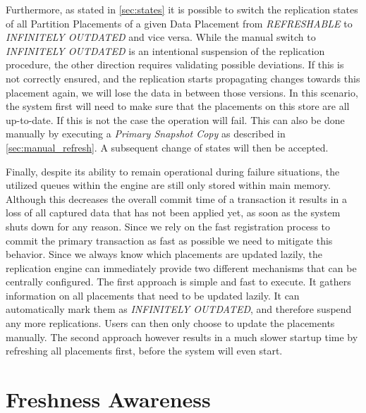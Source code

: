 Furthermore, as stated in \ref{sec:states} it is possible to switch the replication states of all Partition Placements of a given Data Placement from \emph{REFRESHABLE} to 
\emph{INFINITELY OUTDATED} and vice versa.
While the manual switch to \emph{INFINITELY OUTDATED} is an intentional suspension of the replication procedure, the other direction requires validating possible deviations.
If this is not correctly ensured, and the replication starts propagating changes towards this placement again, we will lose the data in between those versions.
In this scenario, the system first will need to make sure that the placements on this store are all up-to-date. If this is not the case the operation will fail. 
This can also be done manually by executing a \emph{Primary Snapshot Copy} as described in \ref{sec:manual_refresh}. A subsequent change of states will then be accepted.

Finally, despite its ability to remain operational during failure situations, the utilized queues within the engine are still only stored within main memory.
Although this decreases the overall commit time of a transaction it results in a loss of all captured data that has not been applied yet, as soon as the system 
shuts down for any reason. Since we rely on the fast registration process to commit the primary transaction as fast as possible we need to mitigate this behavior.
Since we always know which placements are updated lazily, the replication engine can immediately provide two different mechanisms that can be centrally configured. 
The first approach is simple and fast to execute. It gathers information on all placements that need to be updated lazily. It can automatically mark them as 
\emph{INFINITELY OUTDATED}, 
and therefore suspend any more replications. Users can then only choose to update the placements manually.
The second approach however results in a much slower startup time by refreshing all placements first, before the system will even start.









\section{Freshness Awareness}

